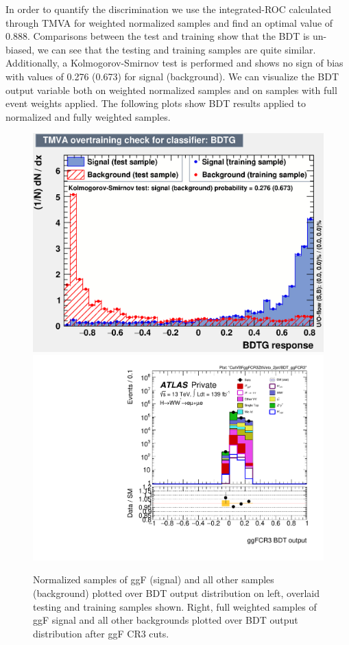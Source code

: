 In order to quantify the discrimination we use the integrated-ROC calculated through TMVA for weighted normalized samples and find an optimal value of 0.888. Comparisons between the test and training show that the BDT is un-biased, we can see that the testing and training samples are quite similar. Additionally, a Kolmogorov-Smirnov test is performed and shows no sign of bias with values of 0.276 (0.673) for signal (background). We can visualize the BDT output variable both on weighted normalized samples and on samples with full event weights applied. The following plots show BDT results applied to normalized and fully weighted samples.

\begin{figure}[!htbp]
\centering
  \includegraphics[width=.45\linewidth]{Pictures/ggFCR3/overtrain_BDTG.eps}
  \includegraphics[width=.35\linewidth]{Pictures/run2-emme-CutVBFggFCR3ZttVeto_2jet-BDT_ggFCR3-log.pdf}
\caption{Normalized samples of ggF (signal) and all other samples (background) plotted over BDT output distribution on left, overlaid testing and training samples shown. Right, full weighted samples of ggF signal and all other backgrounds plotted over BDT output distribution after ggF CR3 cuts.}
\label{fig:ggFCR3BDTresult}
\end{figure}

%


